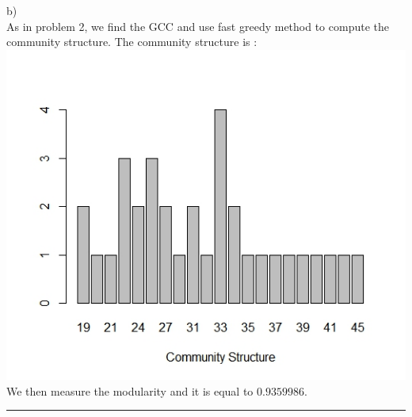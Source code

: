 \documentclass{article}
\begin{document}
b)\\
As in problem 2, we find the GCC and use fast greedy method to compute the community structure. The community structure is :\\
\includegraphics[scale=0.4]{pc5} \\
We then measure the modularity and it is equal to $0.9359986$.\\

\hrule
\end{document}
